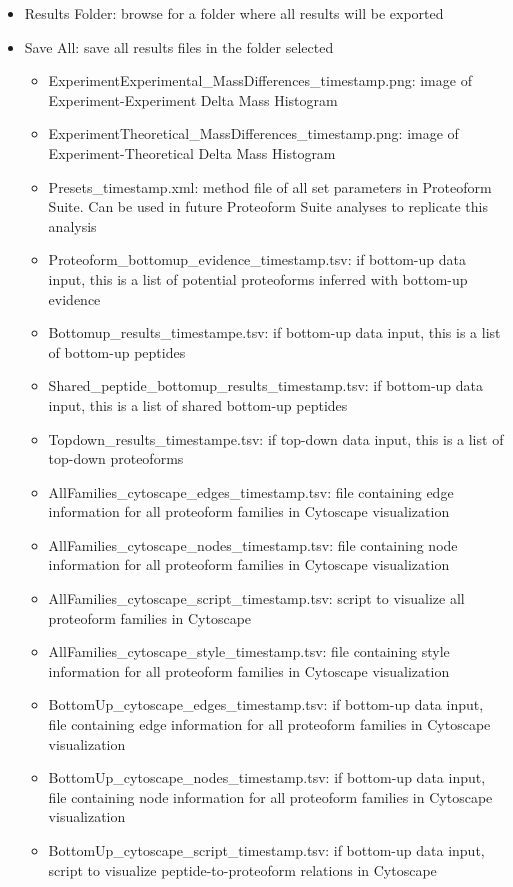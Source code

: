 \begin{itemize}
\item Results Folder: browse for a folder where all results will be exported
\item Save All: save all results files in the folder selected
\begin{itemize}
\item ExperimentExperimental\_MassDifferences\_timestamp.png: image of Experiment-Experiment Delta Mass Histogram
\item ExperimentTheoretical\_MassDifferences\_timestamp.png: image of Experiment-Theoretical Delta Mass Histogram
\item Presets\_timestamp.xml: method file of all set parameters in Proteoform Suite. Can be used in future Proteoform Suite analyses to replicate this analysis
\item Proteoform\_bottomup\_evidence\_timestamp.tsv: if bottom-up data input, this is a list of potential proteoforms inferred with bottom-up evidence
\item Bottomup\_results\_timestampe.tsv: if bottom-up data input, this is a list of bottom-up peptides
\item Shared\_peptide\_bottomup\_results\_timestamp.tsv: if bottom-up data input, this is a list of shared bottom-up peptides
\item Topdown\_results\_timestampe.tsv: if top-down data input, this is a list of top-down proteoforms
\item AllFamilies\_cytoscape\_edges\_timestamp.tsv: file containing edge information for all proteoform families in Cytoscape visualization
\item AllFamilies\_cytoscape\_nodes\_timestamp.tsv: file containing node information for all proteoform families in Cytoscape visualization
\item AllFamilies\_cytoscape\_script\_timestamp.tsv: script to visualize all proteoform families in Cytoscape
\item AllFamilies\_cytoscape\_style\_timestamp.tsv: file containing style information for all proteoform families in Cytoscape visualization
\item BottomUp\_cytoscape\_edges\_timestamp.tsv: if bottom-up data input, file containing edge information for all proteoform families in Cytoscape visualization
\item BottomUp\_cytoscape\_nodes\_timestamp.tsv: if bottom-up data input, file containing node information for all proteoform families in Cytoscape visualization
\item BottomUp\_cytoscape\_script\_timestamp.tsv: if bottom-up data input, script to visualize peptide-to-proteoform relations in Cytoscape

\end{itemize}
\end{itemize}
